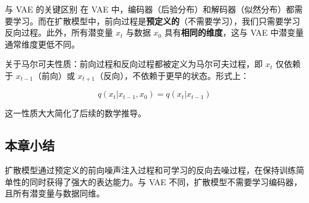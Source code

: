 \begin{knowledgebox}{与 VAE 的关键区别}
在 VAE 中，编码器（后验分布）和解码器（似然分布）都需要学习。而在扩散模型中，前向过程是\textbf{预定义的}（不需要学习），我们只需要学习反向过程。此外，所有潜变量 $x_t$ 与数据 $x_0$ 具有\textbf{相同的维度}，这与 VAE 中潜变量通常维度更低不同。
\end{knowledgebox}

关于马尔可夫性质：前向过程和反向过程都被定义为马尔可夫过程，即 $x_t$ 仅依赖于 $x_{t-1}$（前向）或 $x_{t+1}$（反向），不依赖于更早的状态。形式上：

$$q(x_t | x_{t-1}, x_0) = q(x_t | x_{t-1})$$

这一性质大大简化了后续的数学推导。

\subsection{本章小结}

扩散模型通过预定义的前向噪声注入过程和可学习的反向去噪过程，在保持训练简单性的同时获得了强大的表达能力。与 VAE 不同，扩散模型不需要学习编码器，且所有潜变量与数据同维。


